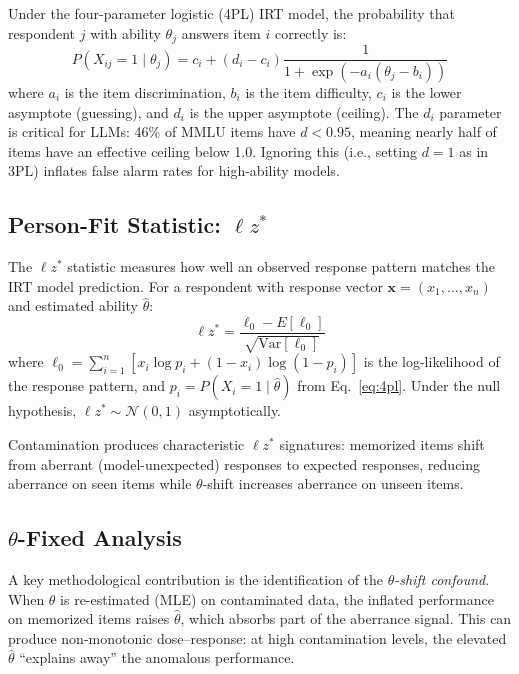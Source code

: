 \documentclass[11pt,a4paper]{article}
\begin{document}
Under the four-parameter logistic (4PL) IRT model, the probability that respondent $j$ with ability $\theta_j$ answers item $i$ correctly is:
\begin{equation}
P(X_{ij} = 1 \mid \theta_j) = c_i + (d_i - c_i) \frac{1}{1 + \exp(-a_i(\theta_j - b_i))}
\label{eq:4pl}
\end{equation}
where $a_i$ is the item discrimination, $b_i$ is the item difficulty, $c_i$ is the lower asymptote (guessing), and $d_i$ is the upper asymptote (ceiling).
The $d_i$ parameter is critical for LLMs: 46\% of MMLU items have $d < 0.95$, meaning nearly half of items have an effective ceiling below 1.0.
Ignoring this (i.e., setting $d = 1$ as in 3PL) inflates false alarm rates for high-ability models.

\subsection{Person-Fit Statistic: $\ell z^*$}

The $\ell z^*$ statistic \citep{snijders2001} measures how well an observed response pattern matches the IRT model prediction.
For a respondent with response vector $\mathbf{x} = (x_1, \ldots, x_n)$ and estimated ability $\hat{\theta}$:
\begin{equation}
\ell z^* = \frac{\ell_0 - E[\ell_0]}{\sqrt{\text{Var}[\ell_0]}}
\end{equation}
where $\ell_0 = \sum_{i=1}^n [x_i \log p_i + (1-x_i) \log(1-p_i)]$ is the log-likelihood of the response pattern, and $p_i = P(X_i = 1 \mid \hat{\theta})$ from Eq.~\ref{eq:4pl}.
Under the null hypothesis, $\ell z^* \sim \mathcal{N}(0,1)$ asymptotically.

Contamination produces characteristic $\ell z^*$ signatures: memorized items shift from aberrant (model-unexpected) responses to expected responses, reducing aberrance on seen items while $\theta$-shift increases aberrance on unseen items.

\subsection{$\theta$-Fixed Analysis}

A key methodological contribution is the identification of the \emph{$\theta$-shift confound}.
When $\theta$ is re-estimated (MLE) on contaminated data, the inflated performance on memorized items raises $\hat{\theta}$, which absorbs part of the aberrance signal.
This can produce non-monotonic dose--response: at high contamination levels, the elevated $\hat{\theta}$ ``explains away'' the anomalous performance.
\end{document}
